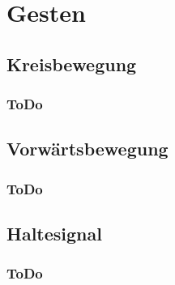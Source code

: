 \chapter{Gesten}
\label{chap:Gesten}

\section{Kreisbewegung}
\subsection{ToDo}

\section{Vorw\"artsbewegung}
\subsection{ToDo}

\section{Haltesignal}
\subsection{ToDo}
